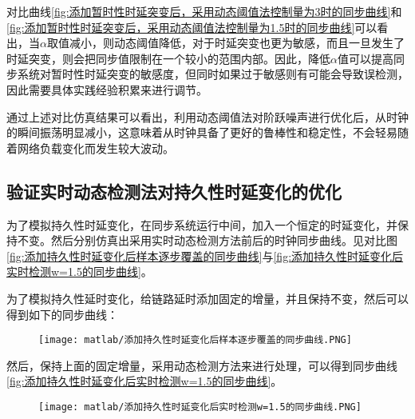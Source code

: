 对比曲线\ref{fig:添加暂时性时延突变后，采用动态阈值法控制量为3时的同步曲线}和\ref{fig:添加暂时性时延突变后，采用动态阈值法控制量为1.5时的同步曲线}可以看出，当$\alpha$取值减小，则动态阈值降低，对于时延突变也更为敏感，而且一旦发生了时延突变，则会把同步值限制在一个较小的范围内部。因此，降低$\alpha$值可以提高同步系统对暂时性时延突变的敏感度，但同时如果过于敏感则有可能会导致误检测，因此需要具体实践经验积累来进行调节。

通过上述对比仿真结果可以看出，利用动态阈值法对阶跃噪声进行优化后，从时钟的瞬间振荡明显减小，这意味着从时钟具备了更好的鲁棒性和稳定性，不会轻易随着网络负载变化而发生较大波动。

\subsection{验证实时动态检测法对持久性时延变化的优化}
为了模拟持久性时延变化，在同步系统运行中间，加入一个恒定的时延变化，并保持不变。然后分别仿真出采用实时动态检测方法前后的时钟同步曲线。见对比图\ref{fig:添加持久性时延变化后样本逐步覆盖的同步曲线}与\ref{fig:添加持久性时延变化后实时检测w=1.5的同步曲线}。

为了模拟持久性延时变化，给链路延时添加固定的增量，并且保持不变，然后可以得到如下的同步曲线：

\begin{figure}[!hbp]
  \centering
  \begin{minipage}[b]{1\textwidth}
    \captionstyle{\centering}
    \centering
    \texttt{[image: matlab/添加持久性时延变化后样本逐步覆盖的同步曲线.PNG]}
  \end{minipage}     
\end{figure}

然后，保持上面的固定增量，采用动态检测方法来进行处理，可以得到同步曲线\ref{fig:添加持久性时延变化后实时检测w=1.5的同步曲线}。
\begin{figure}[htbp]
  \centering
  \begin{minipage}[b]{1\textwidth}
    \captionstyle{\centering}
    \centering
    \texttt{[image: matlab/添加持久性时延变化后实时检测w=1.5的同步曲线.PNG]}
  \end{minipage}     
\end{figure}
\\ \\ \\

